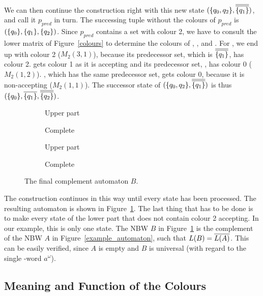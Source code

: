 We can then continue the construction right with this new state $(\qqm02,\cl2{\qm1})$, and call it $p_{pred}$ in turn. The successing tuple without the colours of $p_{pred}$ is $(\{q_{0}\},\{q_{1}\},\{q_{2}\})$. Since $p_{pred}$ contains a set with colour 2, we have to consult the lower matrix of Figure~\ref{colours} to determine the colours of , , and . For , we end up with colour 2 ($M_2(3,1)$), because its predecessor set, which is $\cl2{\qm1}$, has colour 2.  gets colour 1 as it is accepting and its predecessor set, , has colour 0 ($M_2(1,2)$). , which has the same predecessor set, gets colour 0, because it is non-accepting ($M_2(1,1)$). The successor state of $(\qqm02,\cl2{\qm1})$ is thus $(\qm0,\cl1{\qm1},\cl2{\qm2})$.

\begin{figure}[htb]
\centering
  \begin{subfigure}[t]{0.49\textwidth}
  \centering
  \ComplementA
  \caption{Upper part}
  \end{subfigure}
  \hfill
  \begin{subfigure}[t]{0.49\textwidth}
  \centering
  \ComplementB
  \caption{Complete}
  \end{subfigure}

  \begin{subfigure}[t]{0.49\textwidth}
  \centering
  \ComplementC
  \caption{Upper part}
  \end{subfigure}
  \hfill
  \begin{subfigure}[t]{0.49\textwidth}
  \centering
  \ComplementD
  \caption{Complete}
  \end{subfigure}
\caption{The final complement automaton $B$.}
\label{complement}
\end{figure}

\begin{figure}[htb]
\centering
\Complement
\end{figure}

The construction continues in this way until every state has been processed. The resulting automaton is shown in Figure~\ref{complement}. The last thing that has to be done is to make every state of the lower part that does not contain colour 2 accepting. In our example, this is only one state. The NBW $B$ in Figure~\ref{complement} is the complement of the NBW $A$ in Figure~\ref{example_automaton}, such that $L(B) = \cl1{L(A)}$. This can be easily verified, since $A$ is empty and $B$ is universal (with regard to the single \om-word $a^\omega$).

\subsection{Meaning and Function of the Colours}



